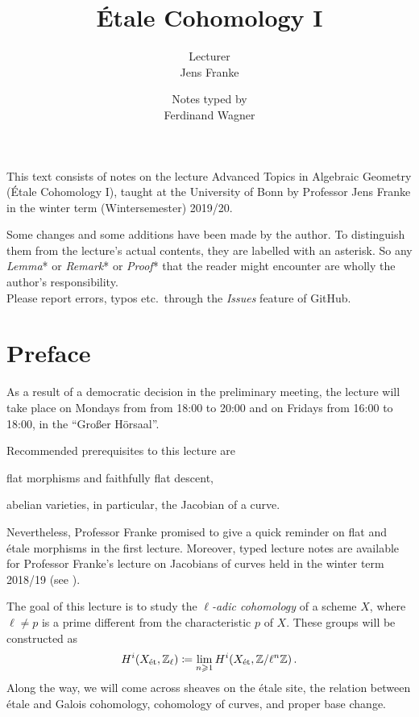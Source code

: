\documentclass[a4paper, 10pt, oneside, DIV=9, chapterprefix=true, numbers=enddot, bibliography=totoc]{scrbook}
\title{Étale Cohomology I}
\author{{\normalsize Lecturer}\\
	Jens Franke}
\date{{\normalsize Notes typed by}\\
	Ferdinand Wagner}
\begin{document}
\frontmatter
{}
\maketitle
\noindent This text consists of notes on the lecture Advanced Topics in Algebraic Geometry (Étale Cohomology I), taught at the University of
Bonn by Professor Jens Franke in the winter term (Wintersemester) 2019/20.

Some changes and some additions have been made by the author. To distinguish them from the lecture's actual contents, they are labelled with an asterisk. So any \emph{Lemma}* or \emph{Remark}* or \emph{Proof}* that the reader might encounter are wholly the author's responsibility.\\[\thmsep]Please report errors, typos etc.\ through the \emph{Issues} feature of GitHub.


\tableofcontents
{}
\chapter{Preface}
As a result of a democratic decision in the preliminary meeting, the lecture will take place on Mondays from from 18:00 to 20:00 and on Fridays from 16:00 to 18:00, in the \enquote{Großer Hörsaal}.

Recommended prerequisites to this lecture are
\begin{temize}
	\item flat morphisms and faithfully flat descent,
	\item abelian varieties, in particular, the Jacobian of a curve.
\end{temize}
Nevertheless, Professor Franke promised to give a quick reminder on flat and étale morphisms in the first lecture. Moreover, typed lecture notes are available for Professor Franke's lecture on Jacobians of curves held in the winter term 2018/19 (see \cite{jacobians}). 

The goal of this lecture is to study the \emph{$\ell$-adic cohomology} of a scheme $X$, where $\ell\neq p$ is a prime different from the characteristic $p$ of $X$. These groups will be constructed as
\begin{align*}
	H^i(X_{\mathrm{\acute{e}t}},\mathbb{Z}_\ell)\coloneqq\operatorname*{lim}_{n\geqslant 1}H^i(X_{\mathrm{\acute{e}t}},\mathbb{Z}/\ell^n\mathbb{Z})\,.
\end{align*}
Along the way, we will come across sheaves on the étale site, the relation between étale and Galois cohomology, cohomology of curves, and proper base change.
\end{document}
